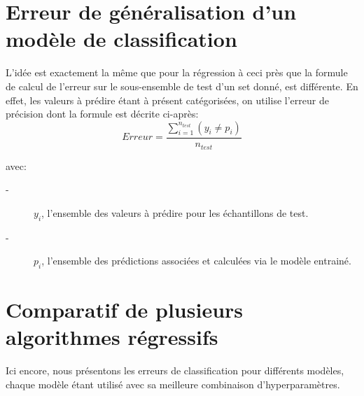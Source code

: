 \documentclass{book}
\begin{document}
\clearpage
 
\section{Erreur de généralisation d'un modèle de classification}

L'idée est exactement la même que pour la régression à ceci près que la formule de calcul de l'erreur sur le sous-ensemble de test d'un set donné, est
différente. En effet, les valeurs à prédire étant à présent catégorisées, on utilise l'erreur de précision dont la formule est décrite ci-après:\\

\begin{equation}
Erreur = \frac{\sum \limits_{\underset{}{i=1}}^{n_{test}} (y_i \neq p_i)}{n_{test}}
\end{equation}

avec:
\begin{description}
\item[-] ${y_i}$, l'ensemble des valeurs à prédire pour les échantillons de test.
\item[-] ${p_i}$, l'ensemble des prédictions associées et calculées via le modèle entrainé.
\end{description}

\section{Comparatif de plusieurs algorithmes régressifs}

Ici encore, nous présentons les erreurs de classification pour différents modèles, chaque modèle étant utilisé avec sa meilleure combinaison
d'hyperparamètres.


\clearpage
\backmatter

\listoftables

\listoffigures



\end{document}
